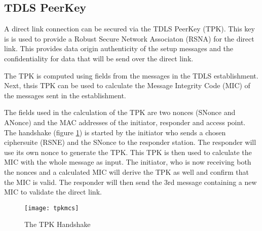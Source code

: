 \subsection{TDLS PeerKey}
\label{sec:tdls-peerkey}

A direct link connection can be secured via the TDLS PeerKey (TPK). This key is is used to provide a Robust Secure Network Associaton (RSNA) for the direct link. This provides data origin authenticity of the setup messages and the confidentiality for data that will be send over the direct link.

The TPK is computed using fields from the messages in the TDLS establishment. Next, thsis TPK can be used to calculate the Message Integrity Code (MIC) of the messages sent in the establishment.

The fields used in the calculation of the TPK are two nonces (SNonce and ANonce) and the MAC addresses of the initiator, responder and access point. The handshake (figure \ref{fig:tpk-mcs}) is started by the initiator who sends a chosen ciphersuite (RSNE) and the SNonce to the responder station. The responder will use its own nonce to generate the TPK. This TPK is then used to calculate the MIC with the whole message as input. The initiator, who is now receiving both the nonces and a calculated MIC will derive the TPK as well and confirm that the MIC is valid. The responder will then send the 3rd message containing a new MIC to validate the direct link.

\begin{figure}[!h]
	\centering
	\texttt{[image: tpkmcs]}
	\caption{The TPK Handshake}
	\label{fig:tpk-mcs}
\end{figure}
